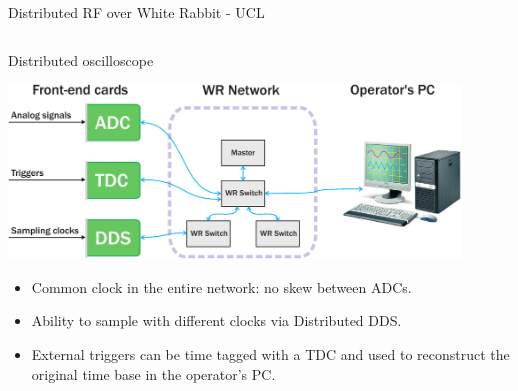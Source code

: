 \documentclass[compress,red]{beamer}
\begin{document}
\begin{frame}{Distributed RF over White Rabbit - UCL}
\begin{columns}[c]
\begin{center}
      \end{center}
  \end{columns}
\end{frame}


\begin{frame}{Distributed oscilloscope}
  \begin{center}
    \includegraphics[width=0.9\textwidth]{applications/distr_oscill.pdf}
    \end{center}
    \begin{block}{}
      \begin{itemize}
      \item Common clock in the entire network: no skew between ADCs.
      \item Ability to sample with different clocks via Distributed DDS.
      \item External triggers can be time tagged with a TDC and used to reconstruct the original time base in the operator's PC.
      \end{itemize}
    \end{block}
\end{frame}
\end{document}
